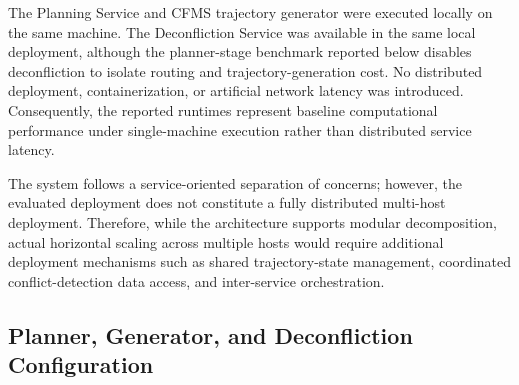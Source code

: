 The Planning Service and CFMS trajectory generator were executed locally on the same machine. The Deconfliction Service was available in the same local deployment, although the planner-stage benchmark reported below disables deconfliction to isolate routing and trajectory-generation cost. No distributed deployment, containerization, or artificial network latency was introduced. Consequently, the reported runtimes represent baseline computational performance under single-machine execution rather than distributed service latency.

The system follows a service-oriented separation of concerns; however, the evaluated deployment does not constitute a fully distributed multi-host deployment. Therefore, while the architecture supports modular decomposition, actual horizontal scaling across multiple hosts would require additional deployment mechanisms such as shared trajectory-state management, coordinated conflict-detection data access, and inter-service orchestration.

\subsection{Planner, Generator, and Deconfliction Configuration}
\label{sec:planner_configuration}

